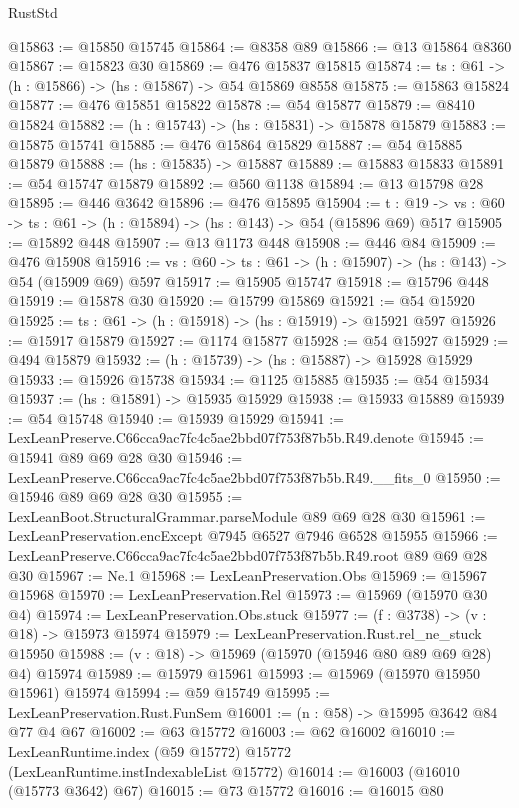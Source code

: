 \begin{lexlean}{RustStd}
\begin{coremodule}
@15863 := @15850 @15745
@15864 := @8358 @89
@15866 := @13 @15864 @8360
@15867 := @15823 @30
@15869 := @476 @15837 @15815
@15874 := {ts : @61} -> (h : @15866) -> (hs : @15867) -> @54 @15869 @8558
@15875 := @15863 @15824
@15877 := @476 @15851 @15822
@15878 := @54 @15877
@15879 := @8410 @15824
@15882 := (h : @15743) -> (hs : @15831) -> @15878 @15879
@15883 := @15875 @15741
@15885 := @476 @15864 @15829
@15887 := @54 @15885 @15879
@15888 := (hs : @15835) -> @15887
@15889 := @15883 @15833
@15891 := @54 @15747 @15879
@15892 := @560 @1138
@15894 := @13 @15798 @28
@15895 := @446 @3642
@15896 := @476 @15895
@15904 := {t : @19} ->
  {vs : @60} -> {ts : @61} -> (h : @15894) -> (hs : @143) -> @54 (@15896 @69) @517
@15905 := @15892 @448
@15907 := @13 @1173 @448
@15908 := @446 @84
@15909 := @476 @15908
@15916 := {vs : @60} -> {ts : @61} -> (h : @15907) -> (hs : @143) -> @54 (@15909 @69) @597
@15917 := @15905 @15747
@15918 := @15796 @448
@15919 := @15878 @30
@15920 := @15799 @15869
@15921 := @54 @15920
@15925 := {ts : @61} -> (h : @15918) -> (hs : @15919) -> @15921 @597
@15926 := @15917 @15879
@15927 := @1174 @15877
@15928 := @54 @15927
@15929 := @494 @15879
@15932 := (h : @15739) -> (hs : @15887) -> @15928 @15929
@15933 := @15926 @15738
@15934 := @1125 @15885
@15935 := @54 @15934
@15937 := (hs : @15891) -> @15935 @15929
@15938 := @15933 @15889
@15939 := @54 @15748
@15940 := @15939 @15929
@15941 := LexLeanPreserve.C66cca9ac7fc4c5ae2bbd07f753f87b5b.R49.denote
@15945 := @15941 @89 @69 @28 @30
@15946 := LexLeanPreserve.C66cca9ac7fc4c5ae2bbd07f753f87b5b.R49.__fits_0
@15950 := @15946 @89 @69 @28 @30
@15955 := LexLeanBoot.StructuralGrammar.parseModule @89 @69 @28 @30
@15961 := LexLeanPreservation.encExcept @7945 @6527 @7946 @6528 @15955
@15966 := LexLeanPreserve.C66cca9ac7fc4c5ae2bbd07f753f87b5b.R49.root @89 @69 @28 @30
@15967 := Ne.{1}
@15968 := LexLeanPreservation.Obs
@15969 := @15967 @15968
@15970 := LexLeanPreservation.Rel
@15973 := @15969 (@15970 @30 @4)
@15974 := LexLeanPreservation.Obs.stuck
@15977 := (f : @3738) -> (v : @18) -> @15973 @15974
@15979 := LexLeanPreservation.Rust.rel_ne_stuck @15950
@15988 := (v : @18) -> @15969 (@15970 (@15946 @80 @89 @69 @28) @4) @15974
@15989 := @15979 @15961
@15993 := @15969 (@15970 @15950 @15961) @15974
@15994 := @59 @15749
@15995 := LexLeanPreservation.Rust.FunSem
@16001 := (n : @58) -> @15995 @3642 @84 @77 @4 @67
@16002 := @63 @15772
@16003 := @62 @16002
@16010 := LexLeanRuntime.index (@59 @15772) @15772 (LexLeanRuntime.instIndexableList @15772)
@16014 := @16003 (@16010 (@15773 @3642) @67)
@16015 := @73 @15772
@16016 := @16015 @80

\end{coremodule}
\end{lexlean}
